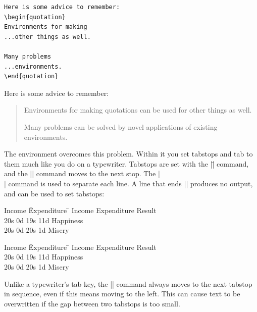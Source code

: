 
\newcommand{\fn}[1]{\hbox{\tt #1}}
\newcommand{\llo}[1]{(see line #1)}
\newcommand{\lls}[1]{(see lines #1)}


\egstart
\begin{verbatim}
Here is some advice to remember:
\begin{quotation}
Environments for making
...other things as well.

Many problems
...environments.
\end{quotation}
\end{verbatim}
\egmid%
Here is some advice to remember:
\begin{quotation}
Environments for making quotations
can be used for other things as well.

Many problems can be solved by
novel applications of existing
environments.
\end{quotation}
\egend

The  environment overcomes this problem. Within it you set
tabstops and tab to them much like you do on a typewriter.  Tabstops are
set with the |\=| command, and the |\>| command moves to the
next stop.  The
|\\| command is used to separate each line.  A line that ends |\kill|
produces no output, and can be used to set tabstops:


\begin{teX}
\begin{tabbing}
 Income \=Expenditure \= \kill
 Income \>Expenditure \>Result\\
 20s 0d  \>19s 11d \>Happiness\\
 20s 0d  \>20s 1d  \>Misery \\
\end{tabbing}
\end{teX}

\smallskip

\begin{tabbing}
Income \=Expenditure \=    \kill
Income \>Expenditure \>Result \\
20s 0d \>19s 11d \>Happiness   \\
20s 0d \>20s 1d  \>Misery    \\
\end{tabbing}


Unlike a typewriter's tab key, the |\>| command always moves to the next
tabstop in sequence, even if this means moving to the left.  This can cause
text to be overwritten if the gap between two tabstops is too small.



